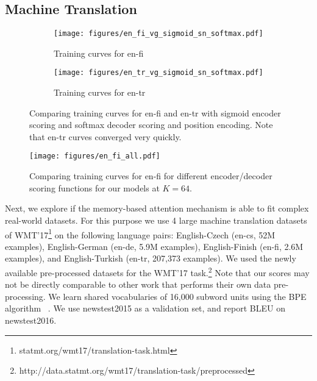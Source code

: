 \documentclass[11pt,letterpaper]{article}
\begin{document}
\subsection{Machine Translation}
\label{sec:nmt}

\begin{figure*}[ht]
\centering

\begin{subfigure}[t]{0.44\textwidth}
\centering
\hspace*{+0.23cm}   
\texttt{[image: figures/en\_fi\_vg\_sigmoid\_sn\_softmax.pdf]}
\caption{Training curves for en-fi}
\label{fig:en_fi_curves}
\end{subfigure}\hfill
\begin{subfigure}[t]{0.432\textwidth}
\centering
\hspace*{-0.785cm}   
\texttt{[image: figures/en\_tr\_vg\_sigmoid\_sn\_softmax.pdf]}
\caption{Training curves for en-tr}
\label{fig:en_tr_curves}
\end{subfigure}

\caption{Comparing training curves for en-fi and en-tr with sigmoid encoder scoring and softmax decoder scoring and position encoding. Note that en-tr curves converged very quickly.}
\label{fig:nmt_curves}
\end{figure*}

\begin{figure}[h]
\centering\hspace*{-0.45cm}
\texttt{[image: figures/en\_fi\_all.pdf]}
\caption{Comparing training curves for en-fi for different encoder/decoder scoring functions for our models at $K=64$.}
\label{fig:nmt_gating}
\end{figure}

Next, we explore if the memory-based attention mechanism is able to fit complex  real-world datasets. For this purpose we use 4 large machine translation datasets of WMT'17\footnote{statmt.org/wmt17/translation-task.html} on the following language pairs: English-Czech (en-cs, 52M examples), English-German (en-de, 5.9M examples), English-Finish (en-fi, 2.6M examples), and English-Turkish (en-tr, 207,373 examples). We used the newly available pre-processed datasets for the WMT'17 task.\footnote{http://data.statmt.org/wmt17/translation-task/preprocessed} Note that our scores may not be directly comparable to other work that performs their own data pre-processing. We learn shared vocabularies of 16,000 subword units using the BPE algorithm ~\cite{Sennrich:2015}. We use newstest2015 as a validation set, and report BLEU on newstest2016.
 
\end{document}
